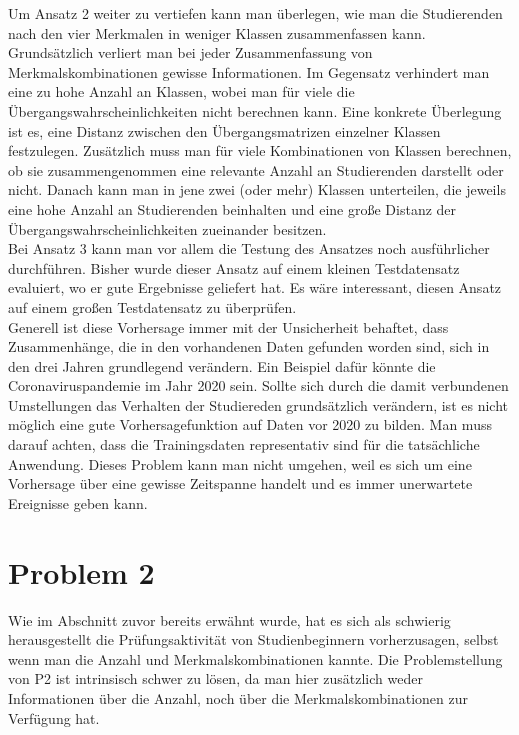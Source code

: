 Um Ansatz 2 weiter zu vertiefen kann man \"uberlegen, wie man die Studierenden nach den vier Merkmalen in weniger Klassen zusammenfassen kann. Grunds\"atzlich verliert man bei
jeder Zusammenfassung von Merkmalskombinationen gewisse Informationen. Im Gegensatz verhindert man eine zu hohe Anzahl an Klassen, wobei man f\"ur viele die \"Ubergangswahrscheinlichkeiten
nicht berechnen kann. Eine konkrete \"Uberlegung ist es, eine Distanz zwischen den \"Ubergangsmatrizen einzelner Klassen festzulegen. Zus\"atzlich muss man f\"ur viele
Kombinationen von Klassen berechnen, ob sie zusammengenommen eine relevante Anzahl an Studierenden darstellt oder nicht. Danach kann man in jene zwei (oder mehr) Klassen
unterteilen, die jeweils eine hohe Anzahl an Studierenden beinhalten und eine gro{\ss}e Distanz der \"Ubergangswahrscheinlichkeiten zueinander besitzen. \\

Bei Ansatz 3 kann man vor allem die Testung des Ansatzes noch ausf\"uhrlicher durchf\"uhren. Bisher wurde dieser Ansatz auf einem kleinen Testdatensatz evaluiert, wo er
gute Ergebnisse geliefert hat. Es w\"are interessant, diesen Ansatz auf einem gro{\ss}en Testdatensatz zu \"uberpr\"ufen. \\

Generell ist diese Vorhersage immer mit der Unsicherheit behaftet, dass Zusammenh\"ange, die in den vorhandenen Daten
gefunden worden sind, sich in den drei Jahren grundlegend ver\"andern. Ein Beispiel daf\"ur k\"onnte die Coronaviruspandemie im Jahr 2020 sein. Sollte sich
durch die damit verbundenen Umstellungen das Verhalten der Studiereden grunds\"atzlich ver\"andern, ist es nicht m\"oglich eine gute Vorhersagefunktion auf Daten
vor 2020 zu bilden. Man muss darauf achten, dass die Trainingsdaten representativ sind f\"ur die tats\"achliche Anwendung. Dieses Problem kann man nicht umgehen,
weil es sich um eine Vorhersage \"uber eine gewisse Zeitspanne handelt und es immer unerwartete Ereignisse geben kann.






\section{Problem 2}

Wie im Abschnitt zuvor bereits erw\"ahnt wurde, hat es sich als schwierig herausgestellt die Pr\"ufungsaktivit\"at von Studienbeginnern vorherzusagen, selbst
wenn man die Anzahl und Merkmalskombinationen kannte. Die Problemstellung von P2 ist intrinsisch schwer zu l\"osen, da man hier zus\"atzlich weder Informationen \"uber die Anzahl, noch \"uber die
Merkmalskombinationen zur Verf\"ugung hat. \\

